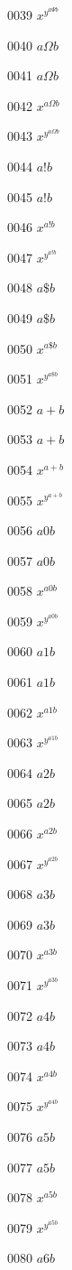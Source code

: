 \documentclass{article}
\begin{document}
0039 $x^{y^{a\Psi b}}$\par
0040 $a\Omega b$\par
0041 $\displaystyle a\Omega b$\par
0042 $x^{a\Omega b}$\par
0043 $x^{y^{a\Omega b}}$\par
0044 $a!b$\par
0045 $\displaystyle a!b$\par
0046 $x^{a!b}$\par
0047 $x^{y^{a!b}}$\par
0048 $a\mathdollar b$\par
0049 $\displaystyle a\mathdollar b$\par
0050 $x^{a\mathdollar b}$\par
0051 $x^{y^{a\mathdollar b}}$\par
0052 $a+b$\par
0053 $\displaystyle a+b$\par
0054 $x^{a+b}$\par
0055 $x^{y^{a+b}}$\par
0056 $a0b$\par
0057 $\displaystyle a0b$\par
0058 $x^{a0b}$\par
0059 $x^{y^{a0b}}$\par
0060 $a1b$\par
0061 $\displaystyle a1b$\par
0062 $x^{a1b}$\par
0063 $x^{y^{a1b}}$\par
0064 $a2b$\par
0065 $\displaystyle a2b$\par
0066 $x^{a2b}$\par
0067 $x^{y^{a2b}}$\par
0068 $a3b$\par
0069 $\displaystyle a3b$\par
0070 $x^{a3b}$\par
0071 $x^{y^{a3b}}$\par
0072 $a4b$\par
0073 $\displaystyle a4b$\par
0074 $x^{a4b}$\par
0075 $x^{y^{a4b}}$\par
0076 $a5b$\par
0077 $\displaystyle a5b$\par
0078 $x^{a5b}$\par
0079 $x^{y^{a5b}}$\par
0080 $a6b$\par
\end{document}
